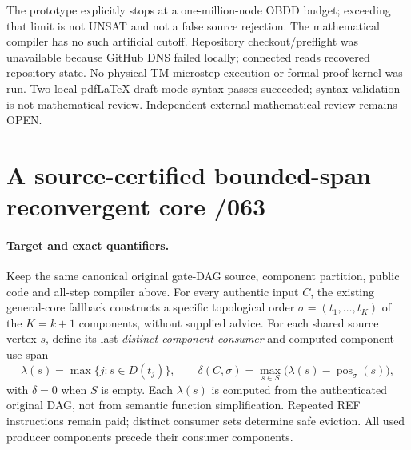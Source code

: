 \documentclass[11pt]{article}
\begin{document}
The prototype explicitly stops at a one-million-node OBDD budget; exceeding that limit is not UNSAT and not a false source rejection. The mathematical compiler has no such artificial cutoff. Repository checkout/preflight was unavailable because GitHub DNS failed locally; connected reads recovered repository state. No physical TM microstep execution or formal proof kernel was run. Two local pdfLaTeX draft-mode syntax passes succeeded; syntax validation is not mathematical review. Independent external mathematical review remains OPEN.

\section{A source-certified bounded-span reconvergent core /063}
\paragraph{Target and exact quantifiers.}
Keep the same canonical original gate-DAG source, component partition, public code and all-step compiler above. For every authentic input $C$, the existing general-core fallback constructs a specific topological order $\sigma=(t_1,\ldots,t_K)$ of the $K=k+1$ components, without supplied advice. For each shared source vertex $s$, define its last \emph{distinct component consumer} and computed component-use span
\[
 \lambda(s)=\max\{j:s\in D(t_j)\},\qquad
 \delta(C,\sigma)=\max_{s\in S}\bigl(\lambda(s)-\operatorname{pos}_\sigma(s)\bigr),
\]
with $\delta=0$ when $S$ is empty. Each $\lambda(s)$ is computed from the authenticated original DAG, not from semantic function simplification. Repeated REF instructions remain paid; distinct consumer sets determine safe eviction. All used producer components precede their consumer components.
\end{document}
